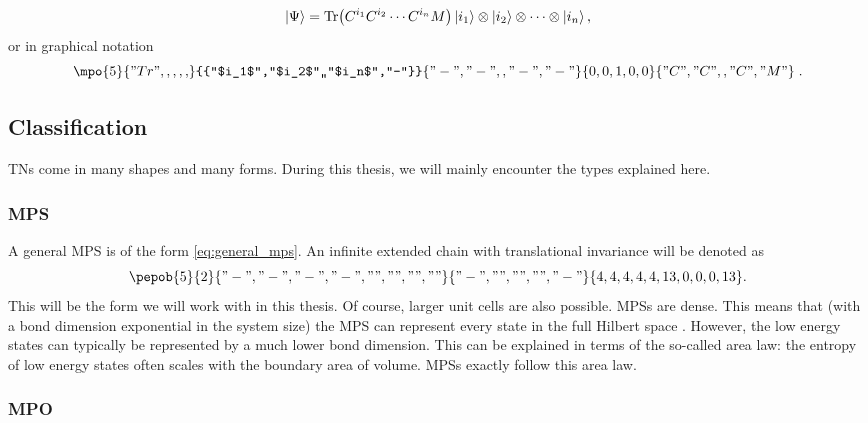 \begin{equation}
    \ket{\Psi} = \Tr( C^{i_1} C^{i_2} \cdots C^{i_n} M  ) \ket{i_1} \otimes \ket{i_2} \otimes \cdots \otimes \ket{i_n},
\end{equation}
or in graphical notation
\begin{equation}\label{eq:general_mps}
    \mpo{5}{{"Tr",,,,,}}{{"$i_1$","$i_2$",,"$i_n$","-"}}{{"-","-",,"-","-"}}{{0,0,1,0,0}}{{"C", "C",,"C","M" }} \; .
\end{equation}

\subsection{Classification}

\Glspl{TN} come in many shapes and many forms. During this thesis, we will mainly encounter the types explained here.

\subsubsection{ MPS}

A general \gls{MPS} is of the form \cref{eq:general_mps}. An infinite extended chain with translational invariance will be denoted as
\begin{equation}\label{mps:uni}
    \pepob{5}{2}{{
                "-","-", "-","-",
                "","","",""}}{{
                "-",
                "",
                "",
                "",
                "-"}}{{
                4,4,4,4,4,
                13,0,0,0,13}} .
\end{equation}
This will be the form we will work with in this thesis. Of course, larger unit cells are also possible. \Glspl{MPS} are dense. This means that (with a bond dimension exponential in the system size) the \Gls{MPS} can represent every state in the full Hilbert space \cite{Orus2014}. However, the low energy states can typically be represented by a much lower bond dimension. This can be explained in terms of the so-called area law: the entropy of low energy states often scales with the boundary area of volume. \Glspl{MPS} exactly follow this area law.

\subsubsection{ MPO} \label{mpo_hamil}

